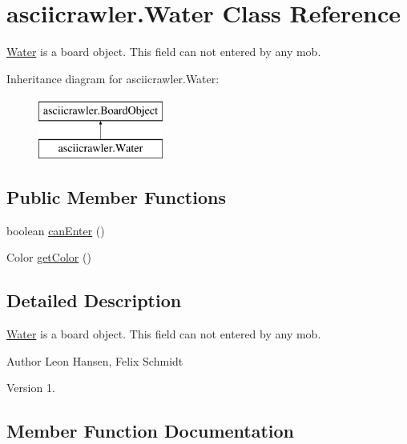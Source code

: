 \hypertarget{classasciicrawler_1_1Water}{}\section{asciicrawler.\+Water Class Reference}
\label{classasciicrawler_1_1Water}


\hyperlink{classasciicrawler_1_1Water}{Water} is a board object. This field can not entered by any mob.  


Inheritance diagram for asciicrawler.\+Water\+:\begin{figure}[H]
\begin{center}
\leavevmode
\includegraphics[height=2.000000cm]{classasciicrawler_1_1Water}
\end{center}
\end{figure}
\subsection*{Public Member Functions}
\begin{DoxyCompactItemize}
\item 
boolean \hyperlink{classasciicrawler_1_1Water_a181a9e47757f74bc49d4df4f8a6677ab}{can\+Enter} ()
\item 
Color \hyperlink{classasciicrawler_1_1Water_a43367f040a73539cdd92421cc351b4ca}{get\+Color} ()
\end{DoxyCompactItemize}


\subsection{Detailed Description}
\hyperlink{classasciicrawler_1_1Water}{Water} is a board object. This field can not entered by any mob. 

\begin{DoxyAuthor}{Author}
Leon Hansen, Felix Schmidt 
\end{DoxyAuthor}
\begin{DoxyVersion}{Version}
1. 
\end{DoxyVersion}


\subsection{Member Function Documentation}
\mbox{\label{classasciicrawler_1_1Water_a181a9e47757f74bc49d4df4f8a6677ab}} 
